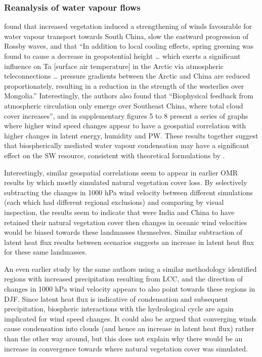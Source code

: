 \subsubsection{Reanalysis of water vapour flows}

\citep{li2020} found that increased vegetation induced a strengthening of winds favourable for water vapour transport towards South China, slow the eastward progression of Rossby waves, and that “In addition to local cooling effects, spring greening was found to cause a decrease in geopotential height … which exerts a significant influence on Ta [surface air temperature] in the Arctic via atmospheric teleconnections … pressure gradients between the Arctic and China are reduced proportionately, resulting in a reduction in the strength of the westerlies over Mongolia.” Interestingly, the authors also found that “Biophysical feedback from atmospheric circulation only emerge over Southeast China, where total cloud cover increases”, and in supplementary figures 5 to 8 present a series of graphs where higher wind speed changes appear to have a geospatial correlation with higher changes in latent energy, humidity and \ac{PW}. These results together suggest that biospherically mediated water vapour condensation may have a significant effect on the \ac{SW} resource, consistent with theoretical formulations by \citet{makarieva2013}.

Interestingly, similar geospatial correlations seem to appear in earlier \ac{OMR} results by \citet{zhao2002} which mostly simulated natural vegetation cover loss. By selectively subtracting the changes in 1000 hPa wind velocity between different simulations (each which had different regional exclusions) and comparing by visual inspection, the results seem to indicate that were India and China to have retained their natural vegetation cover then changes in oceanic wind velocities would be biased towards these landmasses themselves. Similar subtraction of latent heat flux results between scenarios suggests an increase in latent heat flux for these same landmasses.

An even earlier study by the same authors \citep{zhao2001} using a similar methodology identified regions with increased precipitation resulting from \ac{LCC}, and the direction of changes in 1000 hPa wind velocity appears to also point towards these regions in \ac{DJF}. Since latent heat flux is indicative of condensation and subsequent precipitation, biospheric interactions with the hydrological cycle are again implicated for wind speed changes. It could also be argued that converging winds cause condensation into clouds (and hence an increase in latent heat flux) rather than the other way around, but this does not explain why there would be an increase in convergence towards where natural vegetation cover was simulated.

